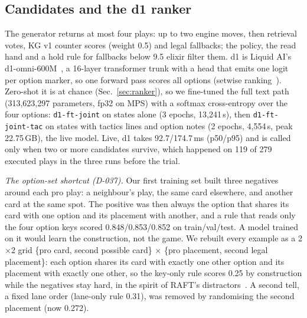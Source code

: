 \documentclass[conference]{IEEEtran}
\newcommand{\tw}[1]{\texttt{#1}}
\begin{document}
\subsection{Candidates and the d1 ranker}
The generator returns at most four plays: up to two engine moves, then retrieval votes, KG v1 counter scores (weight 0.5) and legal fallbacks; the policy, the read hand and a hold rule for fallbacks below 9.5 elixir filter them. %
d1 is Liquid AI's d1-omni-600M~\cite{liquidai2026d1omni}, a 16-layer transformer trunk with a head that emits one logit per option marker, so one forward pass scores all options (setwise ranking~\cite{zhuang2024setwise}). Zero-shot it is at chance (Sec.~\ref{sec:ranker}), so we fine-tuned the full text path (313,623,297 parameters, fp32 on MPS) with a softmax cross-entropy over the four options: \tw{d1-ft-joint} on states alone (3 epochs, 13,241\,s), then \tw{d1-ft-joint-tac} on states with tactics lines and option notes (2 epochs, 4,554\,s, peak 22.75\,GB), the live model. %
Live, d1 takes 92.7/174.7\,ms (p50/p95) and is called only when two or more candidates survive, which happened on 119 of 279 executed plays in the three runs before the trial. %

\emph{The option-set shortcut (D-037).} Our first training set built three negatives around each pro play: a neighbour's play, the same card elsewhere, and another card at the same spot. The positive was then always the option that shares its card with one option and its placement with another, and a rule that reads only the four option keys scored 0.848/0.853/0.852 on train/val/test. A model trained on it would learn the construction, not the game. We rebuilt every example as a 2$\times$2 grid \{pro card, second possible card\} $\times$ \{pro placement, second legal placement\}: each option shares its card with exactly one other option and its placement with exactly one other, so the key-only rule scores 0.25 by construction while the negatives stay hard, in the spirit of RAFT's distractors~\cite{zhang2024raft}. A second tell, a fixed lane order (lane-only rule 0.31), was removed by randomising the second placement (now 0.272). %
\end{document}
